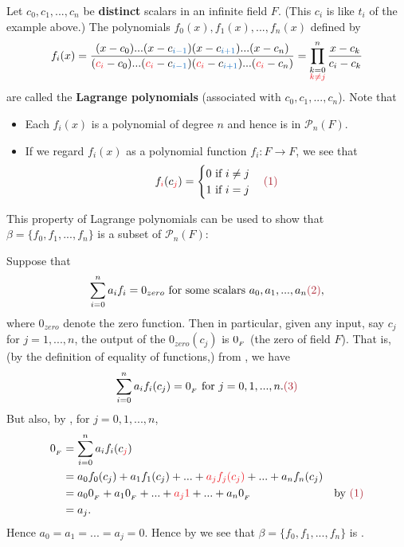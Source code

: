 Let \(c_0, c_1, ..., c_n\) be \textbf{distinct} scalars in an infinite field \(F\).
(This \(c_i\) is like \(t_i\) of the example above.)
The polynomials \(f_0(x), f_1(x), ..., f_n(x)\) defined by
\[
    f_i(x) = \frac{(x - c_0) ... (x - c_{\BLUE{i - 1}})(x - c_{\BLUE{i + 1}}) ... (x - c_n)}{(\RED{c_i} - c_0) ... (\RED{c_i} - c_{\BLUE{i - 1}})(\RED{c_i} - c_{\BLUE{i + 1}}) ... (\RED{c_i} - c_n)}
    = \prod_{\substack{k = 0 \\
                       \RED{k \ne j}}}^n
             \frac{x - c_k}{c_i - c_k}
\]
are called the \textbf{Lagrange polynomials} (associated with \(c_0, c_1, ..., c_n\)).
Note that
\begin{itemize}
\item Each \(f_i(x)\) is a polynomial of degree \(n\) and hence is in \(\mathcal{P}_n(F)\).
\item If we regard \(f_i(x)\) as a polynomial function \(f_i : F \to F\), we see that
    \begin{equation*}
        f_{\RED{i}}(c_{\RED{j}}) =
        \begin{cases}
            0 \text{ if } i \ne j \\
            1 \text{ if } i = j \\
        \end{cases}
        \MAROON{(1)}
    \end{equation*}
\end{itemize}


This property of Lagrange polynomials can be used to show that \(\beta = \{ f_0, f_1, ..., f_n \}\) is a \emph{\LID{}} subset of \(\mathcal{P}_n(F)\):

Suppose that
\[
    \sum_{i = 0}^n a_i f_i = 0_{zero} \text{ for some scalars } a_0, a_1, ..., a_n \MAROON{(2)},
\]
where \(0_{zero}\) denote the zero function.
Then in particular, given any input, say \(c_j\) for \(j = 1, ..., n\), the output of the \(0_{zero}(c_j)\) is \(0_{_F}\) (the zero of field \(F\)).
That is, (by the definition of equality of functions,) from , we have
\[
    \sum_{i = 0}^n a_i f_i(c_j) = \OF \text{ for } j = 0, 1, ..., n. \MAROON{(3)}
\]
But also, by , for \(j = 0, 1, ..., n\),
\begin{align*}
    \OF & = \sum_{i = 0}^n a_i f_i(c_{\RED{j}}) \\
        & = a_0 f_0(c_j) + a_1 f_1(c_j) + ... + \RED{a_j f_j(c_j)} + ... + a_n f_n(c_j) \\
        & = a_0 \OF + a_1 \OF + ... + \RED{a_j 1} + ... + a_n \OF & \text{by \MAROON{(1)}} \\
        & = a_j.
\end{align*}
Hence \(a_0 = a_1 = ... = a_j = 0\).
Hence by  we see that \(\beta = \{ f_0, f_1, ..., f_n \}\) is \LID{}.

